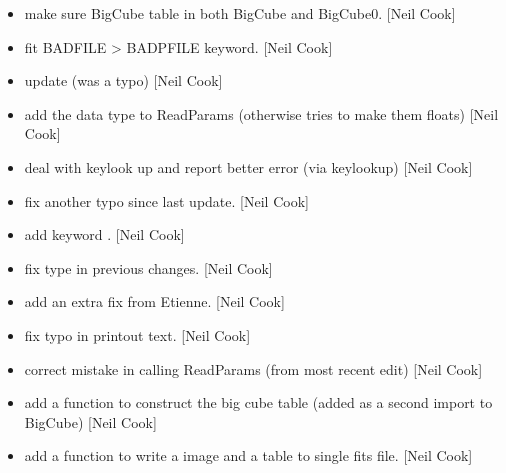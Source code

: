 \documentclass[a4paper,10pt,english]{report}
\begin{document}
\begin{itemize}
\item {} 
 \sphinxhyphen{} make sure BigCube table in both BigCube and
BigCube0. {[}Neil Cook{]}

\item {} 
 \sphinxhyphen{} fit BADFILE \textendash{}\textgreater{} BADPFILE keyword. {[}Neil Cook{]}

\item {} 
 \sphinxhyphen{} update  (was a typo) {[}Neil Cook{]}

\item {} 
 \sphinxhyphen{} add the data type to ReadParams (otherwise
tries to make them floats) {[}Neil Cook{]}

\item {} 
 \sphinxhyphen{} deal with keylook up and report better error (via
keylookup) {[}Neil Cook{]}

\item {} 
 \sphinxhyphen{} fix another typo since last update. {[}Neil
Cook{]}

\item {} 
 \sphinxhyphen{} add keyword . {[}Neil Cook{]}

\item {} 
 \sphinxhyphen{} fix type in previous changes. {[}Neil Cook{]}

\item {} 
 \sphinxhyphen{} add an extra fix from Etienne. {[}Neil
Cook{]}

\item {} 
 \sphinxhyphen{} fix typo in printout text. {[}Neil Cook{]}

\item {} 
 \sphinxhyphen{} correct mistake in calling ReadParams (from
most recent edit) {[}Neil Cook{]}

\item {} 
 \sphinxhyphen{} add a function to construct the big cube table
(added as a second import to BigCube) {[}Neil Cook{]}

\item {} 
 \sphinxhyphen{} add a  function to write a image and
a table to single fits file. {[}Neil Cook{]}


\end{itemize}
\end{document}
